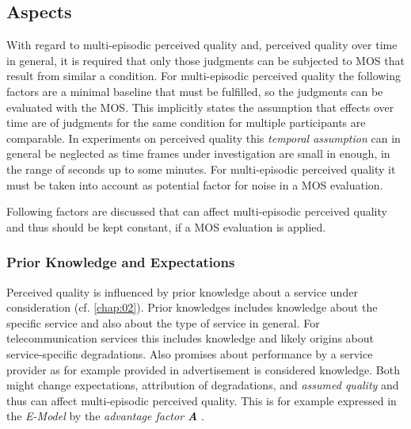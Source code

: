 \subsection{Aspects}
With regard to multi-episodic perceived quality and, perceived quality over time in general, it is required that only those judgments can be subjected to \ac{MOS} that result from similar a condition.
For multi-episodic perceived quality the following factors are a minimal baseline that must be fulfilled, so the judgments can be evaluated with the \ac{MOS}.
This implicitly states the assumption that effects over time are of judgments for the same condition for multiple participants are comparable.
In experiments on perceived quality this \emph{temporal assumption} can in general be neglected as time frames under investigation are small in enough, \ie in the range of seconds up to some minutes.
For multi-episodic perceived quality it must be taken into account as potential factor for noise in a \ac{MOS} evaluation. %

Following factors are discussed that can affect multi-episodic perceived quality and thus should be kept constant, if a \ac{MOS} evaluation is applied.

\subsubsection*{Prior Knowledge and Expectations}
Perceived quality is influenced by prior knowledge about a service under consideration (cf. \autoref{chap:02}).
Prior knowledges includes knowledge about the specific service and also about the type of service in general.
For telecommunication services this includes knowledge and likely origins about service-specific degradations.
Also promises about performance by a service provider as for example provided in advertisement is considered knowledge.
Both might change expectations, attribution of degradations, and \emph{assumed quality} and thus can affect multi-episodic perceived quality.
This is for example expressed in the \emph{E-Model} by the \emph{advantage factor \textbf{A}} \citep{itu-t_g.107:_2014}.

